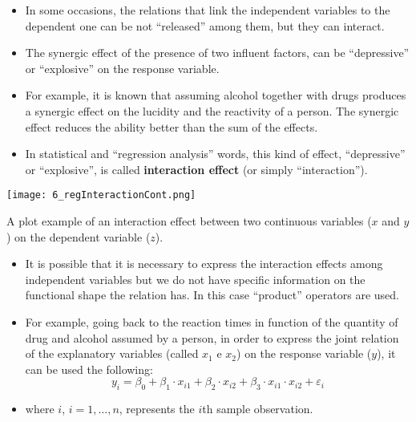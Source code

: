 \begin{frame}
   \vspace*{.25cm}
  \begin{itemize}
    \item In some occasions, the relations that link the independent variables to the dependent one can be not ``released'' among them, but they can interact.
    \vspace{0.15cm}
    \item The synergic effect of the presence of two influent factors, can be ``depressive'' or ``explosive'' on the response variable.
    \vspace{0.15cm}
    \item For example, it is known that assuming alcohol together with drugs produces a synergic effect on the lucidity and the reactivity of a person. The synergic effect reduces the ability better than the sum of the effects.
    \vspace{0.15cm}
    \item In statistical and ``regression analysis'' words, this kind of effect, ``depressive'' or ``explosive'', is called \textbf{interaction effect} (or simply ``interaction'').
  \end{itemize}
\end{frame}

\begin{frame}
  \begin{center}
    \texttt{[image: 6\_regInteractionCont.png]}
  \end{center}
  A plot example of an interaction effect between two continuous variables ($ x $ and $ y $) on the dependent variable ($ z $).
\end{frame}

\begin{frame}
  \vspace*{.25cm}
  \begin{itemize}
    \item It is possible that it is necessary to express the interaction effects among independent variables but we do not have specific information on the functional shape the relation has. In this case ``product'' operators are used. %
    \vspace{0.25cm}
    \item For example, going back to the reaction times in function of the quantity of drug and alcohol assumed by a person, in order to express the joint relation of the explanatory variables (called $ x_1 $ e $ x_2 $) on the response variable ($ y $), it can be used the following:
    \vspace{-0.3cm} $$ y_i = \beta_0 + \beta_1 \cdot x_{i1} + \beta_2 \cdot x_{i2} + \beta_3 \cdot x_{i1} \cdot x_{i2} + \varepsilon_i $$ \vspace{-1cm} \item[]
      where $ i $, $ i=1, \dots, n $, represents the $i$th sample observation.
  \end{itemize}
\end{frame}

